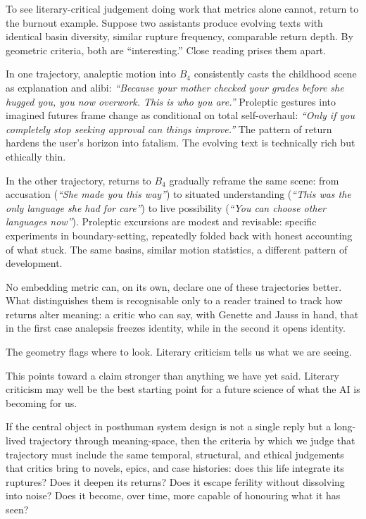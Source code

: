 To see literary-critical judgement doing work that metrics alone cannot, return to the burnout example. Suppose two assistants produce evolving texts with identical basin diversity, similar rupture frequency, comparable return depth. By geometric criteria, both are ``interesting.'' Close reading prises them apart.

In one trajectory, analeptic motion into $B_4$ consistently casts the childhood scene as explanation and alibi: \emph{``Because your mother checked your grades before she hugged you, you now overwork. This is who you are.''} Proleptic gestures into imagined futures frame change as conditional on total self-overhaul: \emph{``Only if you completely stop seeking approval can things improve.''} The pattern of return hardens the user's horizon into fatalism. The evolving text is technically rich but ethically thin.

In the other trajectory, returns to $B_4$ gradually reframe the same scene: from accusation (\emph{``She made you this way''}) to situated understanding (\emph{``This was the only language she had for care''}) to live possibility (\emph{``You can choose other languages now''}). Proleptic excursions are modest and revisable: specific experiments in boundary-setting, repeatedly folded back with honest accounting of what stuck. The same basins, similar motion statistics, a different pattern of development.

No embedding metric can, on its own, declare one of these trajectories better. What distinguishes them is recognisable only to a reader trained to track how returns alter meaning: a critic who can say, with Genette and Jauss in hand, that in the first case analepsis freezes identity, while in the second it opens identity.

The geometry flags where to look. Literary criticism tells us what we are seeing.

This points toward a claim stronger than anything we have yet said. Literary criticism may well be the best starting point for a future science of what the AI is becoming for us. 

If the central object in posthuman system design is not a single reply but a long-lived trajectory through meaning-space, then the criteria by which we judge that trajectory must include the same temporal, structural, and ethical judgements that critics bring to novels, epics, and case histories: does this life integrate its ruptures? Does it deepen its returns? Does it escape ferility without dissolving into noise? Does it become, over time, more capable of honouring what it has seen?

